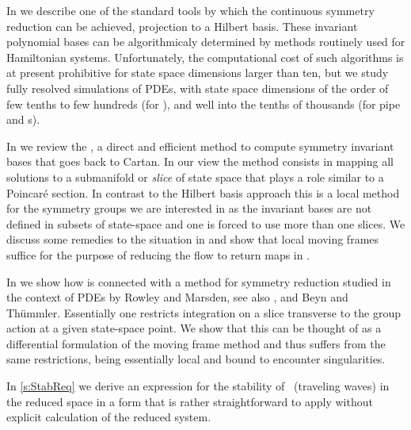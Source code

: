 In  we describe one of the standard tools
by which the continuous symmetry reduction can be achieved,  projection 
to a Hilbert basis. These invariant polynomial bases can be algorithmicaly determined
by methods routinely used for Hamiltonian systems. 
Unfortunately, the computational cost of such algorithms is at present prohibitive 
for state space dimensions larger than ten,
but we study fully resolved simulations of PDEs, with state space dimensions 
of the order of few tenths to few hundreds (for \KSe), and
well into the tenths of thousands (for pipe and \pCf s). 

In  we review the \emph{\mframes}, a 
direct and efficient method to compute 
symmetry invariant bases that goes back to Cartan. In our view the method consists in mapping all solutions
to a submanifold or \emph{slice} of state space that plays a role similar to a Poincar\'e section. In contrast to the Hilbert basis approach this 
is a local method for the symmetry groups we are interested in as the invariant bases are not defined in subsets 
of state-space and one is forced to use more than one slices. We discuss some remedies to the situation 
in  
and show that local moving frames 
suffice for the purpose of reducing the flow to return maps in .

In  we show how {\mframes}
is connected with a method for symmetry reduction studied in
the context of PDEs by Rowley and Marsden, see also , 
and Beyn and Th\"ummler. 
Essentially one restricts integration on a slice transverse to 
the group action at a given state-space point. We show that this can be thought of as a differential formulation 
of the moving frame method and thus suffers from the same restrictions, being essentially local 
and bound to encounter singularities.  

In \ref{s:StabReq} we derive an expression for the stability of \reqva\ (traveling waves) in the reduced space
in a form that is rather straightforward to apply without explicit calculation of
the reduced system.






